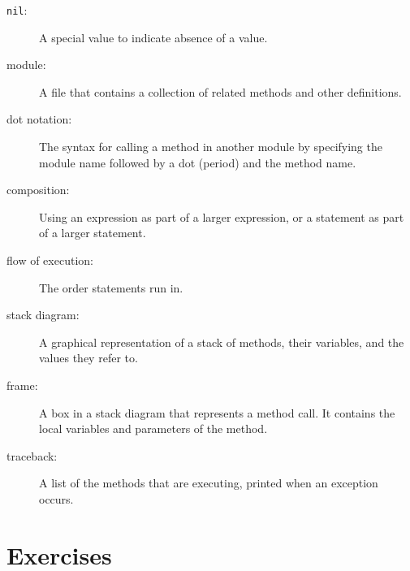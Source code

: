 \documentclass[10pt]{book}
\begin{document}
\begin{description}
\item[{\tt nil}:]  A special value to indicate absence of a value.

\item[module:] A file that contains a
collection of related methods and other definitions.



\item[dot notation:]  The syntax for calling a method in another
module by specifying the module name followed by a dot (period) and
the method name.

\item[composition:] Using an expression as part of a larger expression,
or a statement as part of a larger statement.

\item[flow of execution:]  The order statements run in.

\item[stack diagram:]  A graphical representation of a stack of methods,
their variables, and the values they refer to.

\item[frame:]  A box in a stack diagram that represents a method call.
It contains the local variables and parameters of the method.

\item[traceback:]  A list of the methods that are executing,
printed when an exception occurs.


\end{description}


\section{Exercises}
\end{document}
